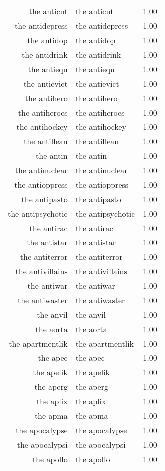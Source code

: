 \begin{table}[ht]
\begin{tabular}{rlr}
  the anticut & the anticut & 1.00 \\ 
  the antidepress & the antidepress & 1.00 \\ 
  the antidop & the antidop & 1.00 \\ 
  the antidrink & the antidrink & 1.00 \\ 
  the antiequ & the antiequ & 1.00 \\ 
  the antievict & the antievict & 1.00 \\ 
  the antihero & the antihero & 1.00 \\ 
  the antiheroes & the antiheroes & 1.00 \\ 
  the antihockey & the antihockey & 1.00 \\ 
  the antillean & the antillean & 1.00 \\ 
  the antin & the antin & 1.00 \\ 
  the antinuclear & the antinuclear & 1.00 \\ 
  the antioppress & the antioppress & 1.00 \\ 
  the antipasto & the antipasto & 1.00 \\ 
  the antipsychotic & the antipsychotic & 1.00 \\ 
  the antirac & the antirac & 1.00 \\ 
  the antistar & the antistar & 1.00 \\ 
  the antiterror & the antiterror & 1.00 \\ 
  the antivillains & the antivillains & 1.00 \\ 
  the antiwar & the antiwar & 1.00 \\ 
  the antiwaster & the antiwaster & 1.00 \\ 
  the anvil & the anvil & 1.00 \\ 
  the aorta & the aorta & 1.00 \\ 
  the apartmentlik & the apartmentlik & 1.00 \\ 
  the apec & the apec & 1.00 \\ 
  the apelik & the apelik & 1.00 \\ 
  the aperg & the aperg & 1.00 \\ 
  the aplix & the aplix & 1.00 \\ 
  the apma & the apma & 1.00 \\ 
  the apocalypse & the apocalypse & 1.00 \\ 
  the apocalypsi & the apocalypsi & 1.00 \\ 
  the apollo & the apollo & 1.00 \\ 

\end{tabular}
\end{table}
